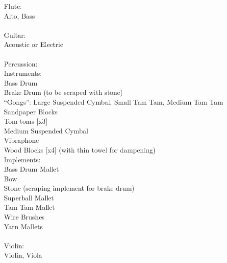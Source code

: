 \documentclass[11pt]{article}
\begin{document}
Flute:
\\
\hspace*{1cm} Alto, Bass
\\
\\
Guitar:
\\
\hspace*{1cm} Acoustic or Electric
\\
\\
Percussion:
\\
\hspace*{1cm} Instruments:
\\
\hspace*{2cm} Bass Drum
\\
\hspace*{2cm} Brake Drum (to be scraped with stone)
\\
\hspace*{2cm} ``Gongs'': Large Suspended Cymbal, Small Tam Tam, Medium Tam Tam
\\
\hspace*{2cm} Sandpaper Blocks
\\
\hspace*{2cm} Tom-toms [x3]
\\
\hspace*{2cm} Medium Suspended Cymbal
\\
\hspace*{2cm} Vibraphone
\\
\hspace*{2cm} Wood Blocks [x4] (with thin towel for dampening)
\\
\hspace*{1cm} Implements:
\\
\hspace*{2cm} Bass Drum Mallet
\\
\hspace*{2cm} Bow
\\
\hspace*{2cm} Stone (scraping implement for brake drum)
\\
\hspace*{2cm} Superball Mallet
\\
\hspace*{2cm} Tam Tam Mallet
\\
\hspace*{2cm} Wire Brushes
\\
\hspace*{2cm} Yarn Mallets
\\
\\
Violin:
\\
\hspace*{1cm} Violin, Viola
\end{document}

